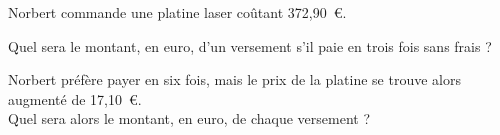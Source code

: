 Norbert commande une platine laser coûtant 372,90~\textgreek{\euro}.
\begin{myenumerate}
\item Quel sera le montant, en euro, d'un versement s'il paie en trois
fois sans frais ?
\item Norbert préfère payer en six fois, mais le prix de la platine se
trouve alors augmenté de 17,10~\textgreek{\euro}.\\ Quel sera alors le
montant, en euro, de chaque versement ?
\end{myenumerate}